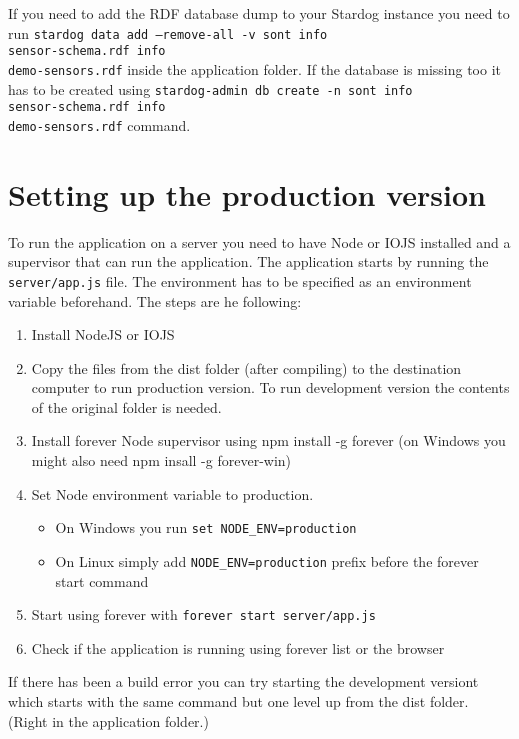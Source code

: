 If you need to add the RDF database dump to your Stardog instance you need to run \texttt{stardog data add --remove-all -v sont info\\sensor-schema.rdf info\\demo-sensors.rdf} inside the application folder. If the database is missing too it has to be created using \texttt{stardog-admin db create -n sont info\\sensor-schema.rdf info\\demo-sensors.rdf} command.

\section{Setting up the production version}

To run the application on a server you need to have Node or IOJS installed and a supervisor that can run the application. The application starts by running the \texttt{server/app.js} file. The environment has to be specified as an environment variable beforehand. The steps are he following:
\begin{enumerate}
\item Install NodeJS or IOJS
\item Copy the files from the dist folder (after compiling) to the destination computer to run production version. To run development version the contents of the original folder is needed.
\item Install forever Node supervisor using npm install -g forever (on Windows you might also need npm insall -g forever-win)
\item Set Node environment variable to production.
\begin{itemize}
\item On Windows you run \texttt{set NODE\_ENV=production}
\item On Linux simply add \texttt{NODE\_ENV=production} prefix before the forever start command
\end{itemize}
\item Start using forever with \texttt{forever start server/app.js}
\item Check if the application is running using forever list or the browser
\end{enumerate}
If there has been a build error you can try starting the development versiont which starts with the same command but one level up from the dist folder. (Right in the application folder.)

